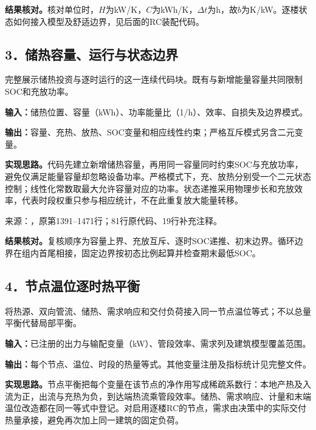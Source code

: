 \noindent\textbf{结果核对。}核对单位时，$H$为kW/K，$C$为kWh/K，$\Delta t$为h，故$b$为K/kW。逐楼状态如何接入模型及舒适边界，见后面的RC装配代码。

\subsection*{3．储热容量、运行与状态边界}
完整展示储热投资与逐时运行的这一连续代码块。既有与新增能量容量共同限制SOC和充放功率。

\noindent\textbf{输入：}储热位置、容量（kWh）、功率能量比（1/h）、效率、自损失及边界模式。\par
\noindent\textbf{输出：}容量、充热、放热、SOC变量和相应线性约束；严格互斥模式另含二元变量。\par

\noindent\textbf{实现思路。}代码先建立新增储热容量，再用同一容量同时约束SOC与充放功率，避免仅满足能量容量却忽略设备功率。严格模式下，充、放热分别受一个二元状态控制；线性化常数取最大允许容量对应的功率。状态递推采用物理步长和充放效率，代表时段权重只参与相应统计，不在此重复放大能量转移。

{\small 来源：，原第1391--1471行；81行原代码、19行补充注释。}\par

\begingroup
{}

\endgroup

\noindent\textbf{结果核对。}复核顺序为容量上界、充放互斥、逐时SOC递推、初末边界。循环边界在组内首尾相接，固定边界按初态比例起算并检查期末最低SOC。

\subsection*{4．节点温位逐时热平衡}
将热源、双向管流、储热、需求响应和交付负荷接入同一节点温位等式；不以总量平衡代替局部平衡。

\noindent\textbf{输入：}已注册的出力与输配变量（kW）、管段效率、需求列及建筑模型覆盖范围。\par
\noindent\textbf{输出：}每个节点、温位、时段的热量等式。其他变量注册及指标统计见完整文件。\par

\noindent\textbf{实现思路。}节点平衡把每个变量在该节点的净作用写成稀疏系数行：本地产热及入流为正，出流与充热为负，到达端热流乘管段效率。储热、需求响应、计量和末端温位改造都在同一等式中登记。对启用逐楼RC的节点，需求由决策中的实际交付热量承接，避免再次加上同一建筑的固定负荷。

